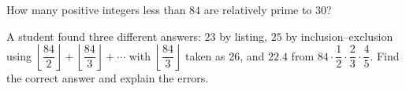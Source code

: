 How many positive integers less than \(84\) are relatively prime to \(30\)?

A student found three different answers: \(23\) by listing, \(25\) by inclusion--exclusion using \(\left\lfloor\dfrac{84}{2}\right\rfloor+\left\lfloor\dfrac{84}{3}\right\rfloor+\cdots\) with \(\left\lfloor\dfrac{84}{3}\right\rfloor\) taken as \(26\), and \(22.4\) from \(84\cdot\dfrac{1}{2}\cdot\dfrac{2}{3}\cdot\dfrac{4}{5}\). Find the correct answer and explain the errors.
